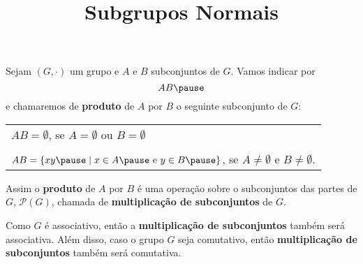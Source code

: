 \documentclass{beamer}
\title{Subgrupos Normais}
\author[\autor]{\autor}
\institute[\instituto]{\instituto}
\date{}
\begin{document}
    \begin{frame}
        \maketitle
    \end{frame}


    \begin{frame}
        Sejam $(G, \cdot)$ um grupo \pause e $A$ e $B$ subconjuntos de $G$. \pause Vamos indicar por \pause
        \[
            AB \pause
        \]
        e chamaremos de \textbf{produto} de $A$ por $B$ \pause o seguinte subconjunto de $G$: \pause
        \begin{center}
            \begin{tabular}{l}
                $AB = \emptyset$, \pause se $A = \emptyset$ ou $B = \emptyset$ \pause\\
                \\
                $AB = \{xy \pause \mid x \in A \pause \mbox{ e } y \in B \pause\}$, se  $A \ne \emptyset$ e $B \ne \emptyset$. \pause
            \end{tabular}
        \end{center}

        \vspace{.3cm}

        Assim o \textbf{produto} de $A$ por $B$ \pause \'e uma opera\c{c}\~ao sobre o subconjuntos das partes de $G$, \pause $\mathcal{P}(G)$, chamada de \textbf{multiplica\c{c}\~ao de subconjuntos} de $G$. \pause

        \vspace{.3cm}

        Como $G$ \'e associativo, \pause ent\~ao a \textbf{multiplica\c{c}\~ao de subconjuntos} tamb\'em ser\'a associativa. \pause Al\'em disso, caso o grupo $G$ seja comutativo, \pause ent\~ao \textbf{multiplica\c{c}\~ao de subconjuntos} tamb\'em ser\'a comutativa.
    \end{frame}
\end{document}
